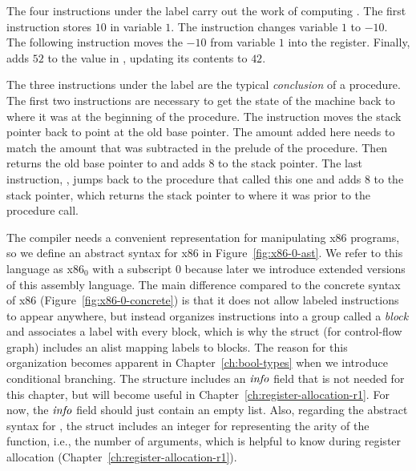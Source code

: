 \documentclass[11pt]{book}
\begin{document}
The four instructions under the label  carry out the work
of computing .
%
The first instruction  stores $10$ in
variable $1$.
%
The instruction  changes variable $1$ to $-10$.
%
The following instruction moves the $-10$ from variable $1$ into the
 register.  Finally,  adds $52$ to
the value in , updating its contents to $42$.

The three instructions under the label  are the
typical \emph{conclusion} of a procedure.  The first
two instructions are necessary to get the state of the machine back to
where it was at the beginning of the procedure.  The instruction
 moves the stack pointer back to point at the
old base pointer. The amount added here needs to match the amount that
was subtracted in the prelude of the procedure. Then 
returns the old base pointer to  and adds $8$ to the stack
pointer.  The last instruction, , jumps back to the
procedure that called this one and adds 8 to the stack pointer, which
returns the stack pointer to where it was prior to the procedure call.

The compiler needs a convenient representation for manipulating x86
programs, so we define an abstract syntax for x86 in
Figure~\ref{fig:x86-0-ast}. We refer to this language as x86$_0$ with
a subscript $0$ because later we introduce extended versions of this
assembly language. The main difference compared to the concrete syntax
of x86 (Figure~\ref{fig:x86-0-concrete}) is that it does not allow
labeled instructions to appear anywhere, but instead organizes
instructions into a group called a
\emph{block} and associates a label
with every block, which is why the  struct (for control-flow
graph) includes an alist mapping labels to blocks. The reason for this
organization becomes apparent in Chapter~\ref{ch:bool-types} when we
introduce conditional branching. The  structure includes
an $\mathit{info}$ field that is not needed for this chapter, but will
become useful in Chapter~\ref{ch:register-allocation-r1}.  For now,
the $\mathit{info}$ field should just contain an empty list. Also,
regarding the abstract syntax for , the 
struct includes an integer for representing the arity of the function,
i.e., the number of arguments, which is helpful to know during
register allocation (Chapter~\ref{ch:register-allocation-r1}).
\end{document}
